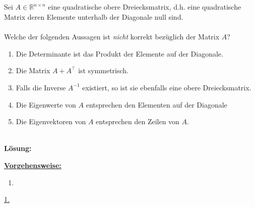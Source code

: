 \subsection*{}
Sei $ A \in \mathbb{R}^{n\times n} $ eine quadratische obere Dreiecksmatrix, d.h. eine quadratische Matrix deren Elemente unterhalb der Diagonale null sind.\\
\\
Welche der folgenden Aussagen ist \textit{nicht} korrekt bezüglich der Matrix $ A $?
\renewcommand{\labelenumi}{(\alph{enumi})}
\begin{enumerate}
	\item 
	Die Determinante ist das Produkt der Elemente auf der Diagonale.
	\item
	Die Matrix $ A + A^\top $ ist symmetrisch.
	\item
	Falls die Inverse $ A^{-1} $ existiert, so ist sie ebenfalls eine obere Dreiecksmatrix.
	\item
	Die Eigenwerte von $ A $ entsprechen den Elementen auf der Diagonale
	\item 
	Die Eigenvektoren von $ A $ entsprechen den Zeilen von $ A $.
\end{enumerate}
\ \\
\textbf{Lösung:}
\begin{mdframed}
	\underline{\textbf{Vorgehensweise:}}
	\renewcommand{\labelenumi}{\theenumi.}
	\begin{enumerate}
		\item 
	\end{enumerate}
\end{mdframed}

\underline{1. }\\


